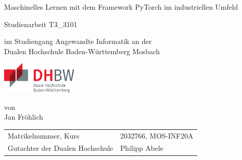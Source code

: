 \def\doctype{Studienarbeit T3\_3101}
\def\title{Maschinelles Lernen mit dem Framework PyTorch im industriellen Umfeld}
\def\author{Jan Fröhlich}

\begin{titlepage}

	\vspace{10mm}

	\begin{center}
		\vspace{5mm}

		\huge \title

		\vspace{42.6pt}

		\large \doctype

		\vspace{42.6pt}

		\small im Studiengang Angewandte Informatik an der \\
		\large Dualen Hochschule Baden-Württemberg Mosbach

		\vspace{14.2pt}

		\includegraphics[height=1.5cm]{assets/logo-dhbw.eps}

		\vspace{42.6pt}

		\small von \\
		\large \author
	\end{center}

	\vspace{98.6pt}

	\begin{table}[h]
		\centering
		\begin{tabular}{ll}
			\small Matrikelnummer, Kurs            & 2032766, MOS-INF20A        \\
			\small Gutachter der Dualen Hochschule & Philipp Abele              \\
		\end{tabular}
	\end{table}

	\vspace{49.7pt}


\end{titlepage}
